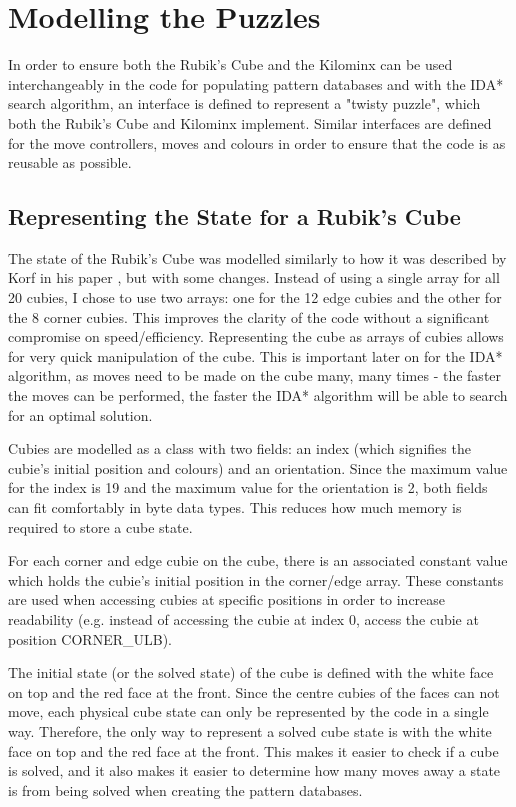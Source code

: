 \section{Modelling the Puzzles}
In order to ensure both the Rubik's Cube and the Kilominx can be used interchangeably in the code for populating pattern databases and with the IDA* search algorithm, an interface is defined to represent a "twisty puzzle", which both the Rubik's Cube and Kilominx implement. Similar interfaces are defined for the move controllers, moves and colours in order to ensure that the code is as reusable as possible. 

\subsection{Representing the State for a Rubik's Cube}
The state of the Rubik's Cube was modelled similarly to how it was described by Korf in his paper \cite{korf}, but with some changes. Instead of using a single array for all 20 cubies, I chose to use two arrays: one for the 12 edge cubies and the other for the 8 corner cubies. This improves the clarity of the code without a significant compromise on speed/efficiency. Representing the cube as arrays of cubies allows for very quick manipulation of the cube. This is important later on for the IDA* algorithm, as moves need to be made on the cube many, many times - the faster the moves can be performed, the faster the IDA* algorithm will be able to search for an optimal solution.


Cubies are modelled as a class with two fields: an index (which signifies the cubie's initial position and colours) and an orientation. Since the maximum value for the index is 19 and the maximum value for the orientation is 2, both fields can fit comfortably in byte data types. This reduces how much memory is required to store a cube state.

For each corner and edge cubie on the cube, there is an associated constant value which holds the cubie's initial position in the corner/edge array. These constants are used when accessing cubies at specific positions in order to increase readability (e.g. instead of accessing the cubie at index 0, access the cubie at position CORNER\_ULB).

The initial state (or the solved state) of the cube is defined with the white face on top and the red face at the front. Since the centre cubies of the faces can not move, each physical cube state can only be represented by the code in a single way. Therefore, the only way to represent a solved cube state is with the white face on top and the red face at the front. This makes it easier to check if a cube is solved, and it also makes it easier to determine how many moves away a state is from being solved when creating the pattern databases.

